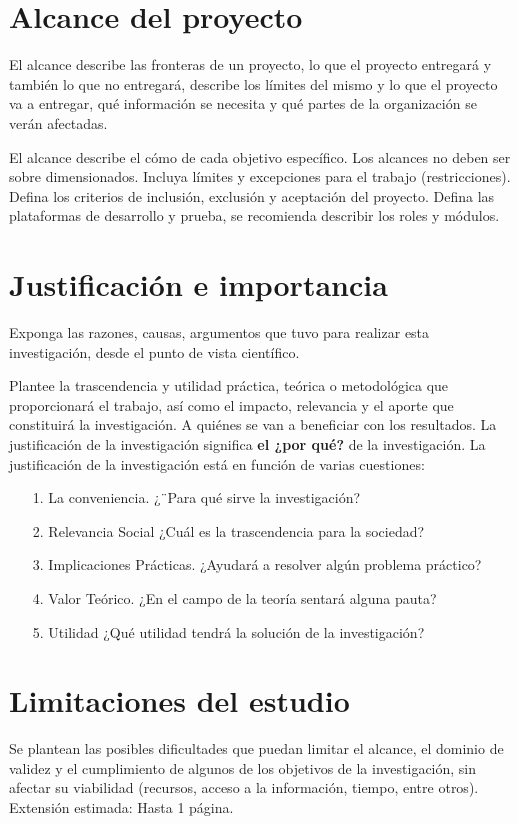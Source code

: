 \documentclass[12pt, a4paper, nofontenc, numbers=endperiod]{apa7}
\begin{document}
{	\section{\normalsize \centering Alcance del proyecto} 
	\setlength{\parindent}{1.27cm}El alcance describe las fronteras de un proyecto, lo que el proyecto entregará y también lo que no entregará, describe los límites del mismo y lo que el proyecto va a entregar, qué información se necesita y qué partes de la organización se verán afectadas. 
	
	\setlength{\parindent}{1.27cm}El alcance describe el cómo de cada objetivo específico. Los alcances no deben ser sobre dimensionados. Incluya límites y excepciones para el trabajo (restricciones).  Defina los criterios de inclusión, exclusión y aceptación del proyecto. Defina las plataformas de desarrollo y prueba, se recomienda describir los roles y módulos. 
	
		\section{\normalsize \centering Justificación e importancia}
	
	\setlength{\parindent}{1.27cm}Exponga las razones, causas, argumentos que tuvo para realizar esta investigación, desde el punto de vista científico.
	
	\setlength{\parindent}{1.27cm}Plantee la trascendencia y utilidad práctica, teórica o metodológica que proporcionará el trabajo, así como el impacto, relevancia y el aporte que constituirá la investigación.  
	\setlength{\parindent}{1.27cm}A quiénes se van a beneficiar con los resultados. La justificación de la investigación significa \textbf{el ¿por qué?} de la investigación. La justificación de la investigación está en función de varias cuestiones:
{\doublespacing
	\begin{itemize}[leftmargin=1.70cm]
		\item[1.] La conveniencia. ¿¨Para qué sirve la investigación? 
		\item[2.] Relevancia Social ¿Cuál es la trascendencia para la sociedad? 
		\item[3.] Implicaciones Prácticas. ¿Ayudará a resolver algún problema práctico? 
		\item[4.] Valor Teórico. ¿En el campo de la teoría sentará alguna pauta? 
		\item[5.] Utilidad ¿Qué utilidad tendrá la solución de la investigación? 
	\end{itemize}
}	
	
	\section{\normalsize \centering Limitaciones del estudio} 
	Se plantean las posibles dificultades que puedan limitar \setlength{\parindent}{1.27cm}el alcance, el dominio de validez y el cumplimiento de algunos de los objetivos de la investigación, sin afectar su viabilidad (recursos, acceso a la información, tiempo, entre otros). Extensión estimada: Hasta 1 página.
}
\end{document}
